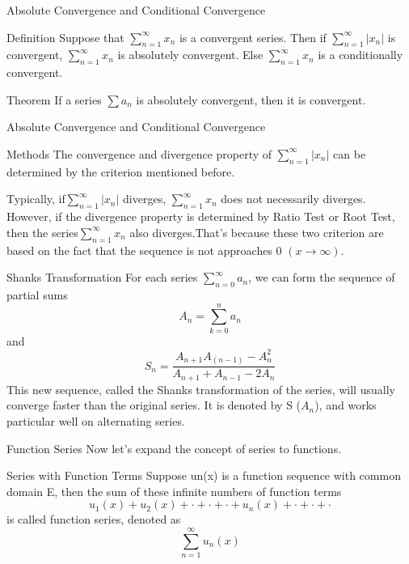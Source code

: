 \documentclass{beamer}
\begin{document}
\begin{frame}{Absolute Convergence and Conditional Convergence}
    \begin{block}{Definition}
        Suppose that $\sum\limits_{n=1}^{\infty} x_n$ is a convergent series. Then if $\sum\limits_{n=1}^{\infty} |x_n|$ is convergent, $\sum\limits_{n=1}^{\infty} x_n$ is absolutely convergent. Else $\sum\limits_{n=1}^{\infty} x_n$ is a conditionally convergent.
    \end{block}
    \begin{block}{Theorem}
    If a series $\sum a_n$ is absolutely convergent, then it is convergent.
    \end{block}
\end{frame}

\begin{frame}{Absolute Convergence and Conditional Convergence}
    \begin{block}{Methods}
    The convergence and divergence property of $\sum_{n=1}^{\infty} |x_n|$ can be determined by the criterion mentioned before.
    \end{block}
    Typically, if$\sum_{n=1}^{\infty} |x_n|$ diverges, $\sum_{n=1}^{\infty} x_n$ does not necessarily diverges. \\However, if the divergence property is determined by Ratio Test or Root Test, then the series$\sum_{n=1}^{\infty} x_n$ also diverges.That’s because these two criterion are based on the fact that the sequence is not approaches 0 $(x \rightarrow \infty)$.
\end{frame}

\begin{frame}{Shanks Transformation}
    For each series $\sum_{n=0}^{\infty} a_n$, we can form the sequence of partial sums
    $$A_n= \sum \limits _{k=0}^{n} a_n$$
    and
    $$S_n=\frac{A_{n+1}A_(n-1)-A_n^2}{A_{n+1}+A_{n-1}-2A_n}$$
    This new sequence, called the Shanks transformation of the series, will usually converge faster than the original series. It is denoted by S ($A_n$), and works particular well on alternating series.
\end{frame}
\begin{frame}{Function Series}
    Now let’s expand the concept of series to functions.
    \begin{block}{Series with Function Terms}
        Suppose un(x) is a function sequence with common domain E, then the sum of these infinite numbers of function terms $$u_1(x)+u_2(x)+\cdot+\cdot+\cdot+u_n(x)+\cdot+\cdot+\cdot$$ is called function series, denoted as $$\sum\limits_{n=1}^{\infty}u_n(x)$$
    \end{block}
\end{frame}
\end{document}
